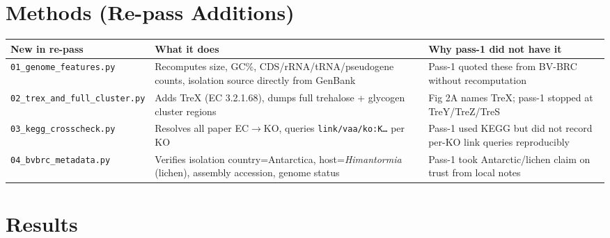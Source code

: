\documentclass[11pt,letterpaper]{article}
\begin{document}
\section{Methods (Re-pass Additions)}
\begin{tabularx}{\linewidth}{@{}l X X@{}}
\toprule
New in re-pass & What it does & Why pass-1 did not have it \\
\midrule
\texttt{01\_genome\_features.py} & Recomputes size, GC\%, CDS/rRNA/tRNA/pseudogene counts, isolation source directly from GenBank & Pass-1 quoted these from BV-BRC without recomputation \\
\texttt{02\_trex\_and\_full\_cluster.py} & Adds TreX (EC 3.2.1.68), dumps full trehalose + glycogen cluster regions & Fig 2A names TreX; pass-1 stopped at TreY/TreZ/TreS \\
\texttt{03\_kegg\_crosscheck.py} & Resolves all paper EC$\to$KO, queries \texttt{link/vaa/ko:K\ldots} per KO & Pass-1 used KEGG but did not record per-KO link queries reproducibly \\
\texttt{04\_bvbrc\_metadata.py} & Verifies isolation country=Antarctica, host=\textit{Himantormia} (lichen), assembly accession, genome status & Pass-1 took Antarctic/lichen claim on trust from local notes \\
\bottomrule
\end{tabularx}

\section{Results}
\end{document}
